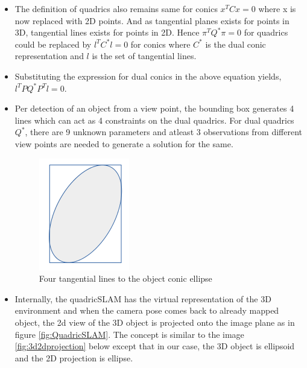 \documentclass[report.tex]{subfiles}
\begin{document}
\begin{itemize}
\item The definition of quadrics also remains same for conics $x^{T}Cx = 0$ where x is now replaced with 2D points. And as tangential planes exists for points in 3D, tangential lines exists for points in 2D. Hence $\pi^{T}Q^{*}\pi = 0$ for quadrics could be replaced by $l^{T} C^{*} l = 0$ for conics where $C^{*}$ is the dual conic representation and $l$ is the set of tangential lines.
\item Substituting the expression for dual conics in the above equation yields, $l^{T} P Q^{*} P^{T} l = 0$.
\item Per detection of an object from a view point, the bounding box generates 4 lines which can act as 4 constraints on the dual quadrics. For dual quadrics $Q^{*}$, there are 9 unknown parameters and atleast 3 observations from different view points are needed to generate a solution for the same.
\begin{figure}[H]
    \centering
    \includegraphics{Images/bbox.png}
    \caption{Four tangential lines to the object conic ellipse}
    \label{fig:bbox}
\end{figure}

\item Internally, the quadricSLAM has the virtual representation of the 3D environment and when the camera pose comes back to already mapped object, the 2d view of the 3D object is projected onto the image plane as in figure \ref{fig:QuadricSLAM}. The concept is similar to the image \ref{fig:3d2dprojection} below except that in our case, the 3D object is ellipsoid and the 2D projection is ellipse.


\end{itemize}
\end{document}
